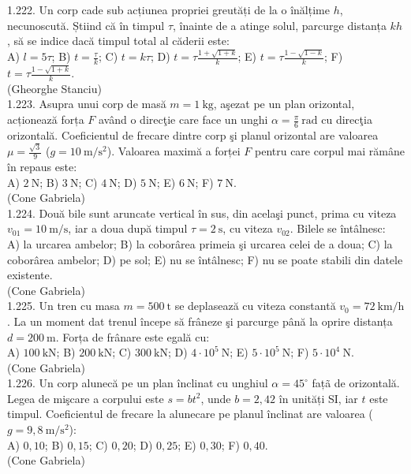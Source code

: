 {1.222. Un corp cade sub acțiunea propriei greutăți de la o înălțime $h$, necunoscută. Știind că în timpul $\tau$, înainte de a atinge solul, parcurge distanța $k h$, să se indice dacă timpul total al căderii este:\\ A) $l=5 \tau$; B) $t=\frac{\tau}{k}$; C) $t=k \tau$; D) $t=\tau \frac{1+\sqrt{1+k}}{k}$; E) $t=\tau \frac{1-\sqrt{1-k}}{k}$; F) $t=\tau \frac{1-\sqrt{1+k}}{k}$.\\ (Gheorghe Stanciu)\\

1.223. Asupra unui corp de masă $m=1 \mathrm{~kg}$, aşezat pe un plan orizontal, acționează forța $F$ având o direcţie care face un unghi $\alpha=\frac{\pi}{6} \mathrm{~rad}$ cu direcţia orizontală. Coeficientul de frecare dintre corp şi planul orizontal are valoarea $\mu=\frac{\sqrt{3}}{9}$ ($g=10 \mathrm{~m} / \mathrm{s}^{2}$). Valoarea maximă a forței $F$ pentru care corpul mai rămâne în repaus este:\\ A) $2 \mathrm{~N}$; B) $3 \mathrm{~N}$; C) $4 \mathrm{~N}$; D) $5 \mathrm{~N}$; E) $6 \mathrm{~N}$; F) $7 \mathrm{~N}$.\\ (Cone Gabriela)\\

1.224. Două bile sunt aruncate vertical în sus, din acelaşi punct, prima cu viteza $v_{01}=10 \mathrm{~m} / \mathrm{s}$, iar a doua după timpul $\tau=2 \mathrm{~s}$, cu viteza $v_{02}$. Bilele se întâlnesc:\\ A) la urcarea ambelor; B) la coborârea primeia şi urcarea celei de a doua; C) la coborârea ambelor; D) pe sol; E) nu se întâlnesc; F) nu se poate stabili din datele existente.\\ (Cone Gabriela)\\

1.225. Un tren cu masa $m=500 \mathrm{~t}$ se deplasează cu viteza constantă $v_{0}=72 \mathrm{~km} / \mathrm{h}$. La un moment dat trenul începe să frâneze şi parcurge până la oprire distanța $d=200 \mathrm{~m}$. Forța de frânare este egală cu:\\ A) $100 \mathrm{~kN}$; B) $200 \mathrm{~kN}$; C) $300 \mathrm{~kN}$; D) $4 \cdot 10^{5} \mathrm{~N}$; E) $5 \cdot 10^{5} \mathrm{~N}$; F) $5 \cdot 10^{4} \mathrm{~N}$.\\ (Cone Gabriela)\\

1.226. Un corp alunecă pe un plan înclinat cu unghiul $\alpha=45^{\circ}$ fațã de orizontală. Legea de mişcare a corpului este $s=b t^{2}$, unde $b=2,42$ în unități SI, iar $t$ este timpul. Coeficientul de frecare la alunecare pe planul înclinat are valoarea ($g=9,8 \mathrm{~m} / \mathrm{s}^{2}$):\\ A) $0,10$; B) $0,15$; C) $0,20$; D) $0,25$; E) $0,30$; F) $0,40$.\\ (Cone Gabriela)\\

}
